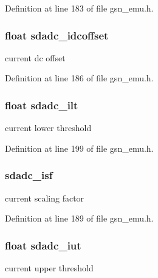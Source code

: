 Definition at line 183 of file gsn\_\-emu.h.

\hypertarget{a00058_a852ece992b3a45bf11166b4c5cc23287}{
\subsubsection[{sdadc\_\-idcoffset}]{\setlength{\rightskip}{0pt plus 5cm}float {\bf sdadc\_\-idcoffset}}}
\label{a00058_a852ece992b3a45bf11166b4c5cc23287}
current dc offset 

Definition at line 186 of file gsn\_\-emu.h.

\hypertarget{a00058_a0538001757e3a34278514a6db3dc0181}{
\subsubsection[{sdadc\_\-ilt}]{\setlength{\rightskip}{0pt plus 5cm}float {\bf sdadc\_\-ilt}}}
\label{a00058_a0538001757e3a34278514a6db3dc0181}
current lower threshold 

Definition at line 199 of file gsn\_\-emu.h.

\hypertarget{a00058_ac6f34dcb9689e22a9c0634bb0d2c99a2}{
\subsubsection[{sdadc\_\-isf}]{ {\bf sdadc\_\-isf}}}
\label{a00058_ac6f34dcb9689e22a9c0634bb0d2c99a2}
current scaling factor 

Definition at line 189 of file gsn\_\-emu.h.

\hypertarget{a00058_afd683a03afa22535af11ffb7a7264fdf}{
\subsubsection[{sdadc\_\-iut}]{\setlength{\rightskip}{0pt plus 5cm}float {\bf sdadc\_\-iut}}}
\label{a00058_afd683a03afa22535af11ffb7a7264fdf}
current upper threshold 

